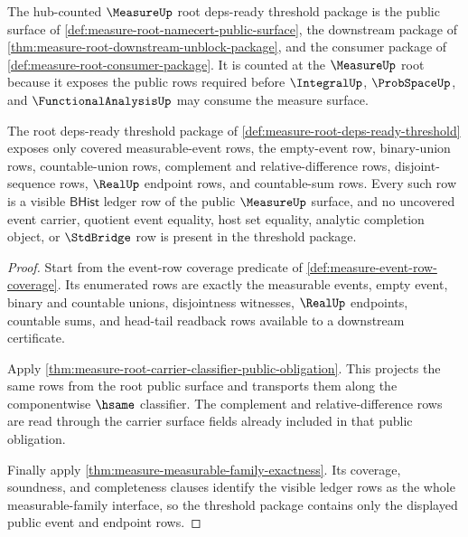 \begin{definition}
\label{def:measure-root-deps-ready-threshold}
The hub-counted $\MeasureUp$ root deps-ready threshold package is the public
surface of \autoref{def:measure-root-namecert-public-surface}, the downstream
package of \autoref{thm:measure-root-downstream-unblock-package}, and the
consumer package of \autoref{def:measure-root-consumer-package}. It is counted
at the $\MeasureUp$ root because it exposes the public rows required before
$\IntegralUp$, $\ProbSpaceUp$, and $\FunctionalAnalysisUp$ may consume the
measure surface.
\end{definition}

\begin{theorem}
\label{thm:measure-root-public-event-coverage-threshold}
The root deps-ready threshold package of
\autoref{def:measure-root-deps-ready-threshold} exposes only covered
measurable-event rows, the empty-event row, binary-union rows, countable-union
rows, complement and relative-difference rows, disjoint-sequence rows,
$\RealUp$ endpoint rows, and countable-sum rows. Every such row is a visible
$\mathsf{BHist}$ ledger row of the public $\MeasureUp$ surface, and no
uncovered event carrier, quotient event equality, host set equality, analytic
completion object, or $\StdBridge$ row is present in the threshold package.
\end{theorem}
\begin{proof}
Start from the event-row coverage predicate of
\autoref{def:measure-event-row-coverage}. Its enumerated rows are exactly the
measurable events, empty event, binary and countable unions, disjointness
witnesses, $\RealUp$ endpoints, countable sums, and head-tail readback rows
available to a downstream certificate.

Apply \autoref{thm:measure-root-carrier-classifier-public-obligation}. This
projects the same rows from the root public surface and transports them along
the componentwise $\hsame$ classifier. The complement and
relative-difference rows are read through the carrier surface fields already
included in that public obligation.

Finally apply \autoref{thm:measure-measurable-family-exactness}. Its
coverage, soundness, and completeness clauses identify the visible ledger rows
as the whole measurable-family interface, so the threshold package contains
only the displayed public event and endpoint rows.
\end{proof}

